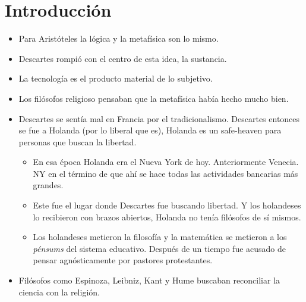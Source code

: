 \section{Introducción}
\begin{itemize}
    \item Para Aristóteles la lógica y la metafísica son lo mismo.
    \item Descartes rompió con el centro de esta idea, la sustancia. 
    \item La tecnología es el producto material de lo subjetivo. 
    \item Los filósofos religioso pensaban que la metafísica había hecho mucho bien. 
    \item Descartes se sentía mal en Francia por el tradicionalismo. Descartes entonces se fue a Holanda (por lo liberal que es), Holanda es un safe-heaven para personas que buscan la libertad. 
        \begin{itemize}
            \item En esa época Holanda era el Nueva York de hoy. Anteriormente Venecia. NY en el término de que ahí se hace todas las actividades bancarias más grandes. 
            \item Este fue el lugar donde Descartes fue buscando libertad. Y los holandeses lo recibieron con brazos abiertos, Holanda no tenía filósofos de sí mismos. 
            \item Los holandeses metieron la filosofía y la matemática se metieron a los \emph{pénsums} del sistema educativo. Después de un tiempo fue acusado de pensar agnósticamente por pastores protestantes.
        \end{itemize}

    \item Filósofos como Espinoza, Leibniz, Kant y Hume buscaban reconciliar la ciencia con la religión.
\end{itemize}


